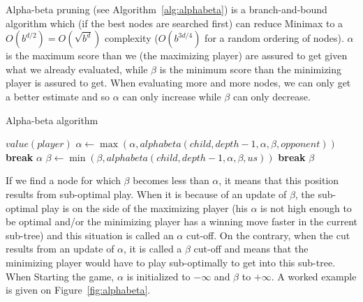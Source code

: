 Alpha-beta pruning (see Algorithm~\ref{alg:alphabeta}) is a branch-and-bound algorithm which (if the best nodes are searched first) can reduce Minimax to a $O(b^{d/2})=O(\sqrt{b^d})$ complexity ($O(b^{3d/4})$ for a random ordering of nodes). $\alpha$ is the maximum score than we (the maximizing player) are assured to get given what we already evaluated, while $\beta$ is the minimum score than the minimizing player is assured to get. When evaluating more and more nodes, we can only get a better estimate and so $\alpha$ can only increase while $\beta$ can only decrease. %
\begin{algorithm}
\caption{Alpha-beta algorithm}
\label{alg:alphabeta}
\begin{algorithmic}
        \State \Return $value(player)$
    \EndIf
            \State $\alpha \gets \max{(\alpha, alphabeta(child,depth-1,\alpha,\beta,opponent))}$
            \If{$\beta \leq \alpha$}
                \State \textbf{break}
            \EndIf
        \EndFor
        \State \Return $\alpha$
    \Else
            \State $\beta \gets \min{(\beta, alphabeta(child,depth-1,\alpha,\beta,us))}$
            \If{$\beta \leq \alpha$}
                \State \textbf{break}
            \EndIf
        \EndFor
        \State \Return $\beta$
    \EndIf
\EndFunction
\end{algorithmic}
\end{algorithm}
If we find a node for which $\beta$ becomes less than $\alpha$, it means that this position results from sub-optimal play. When it is because of an update of $\beta$, the sub-optimal play is on the side of the maximizing player (his $\alpha$ is not high enough to be optimal and/or the minimizing player has a winning move faster in the current sub-tree) and this situation is called an $\alpha$ cut-off. On the contrary, when the cut results from an update of $\alpha$, it is called a $\beta$ cut-off and means that the minimizing player would have to play sub-optimally to get into this sub-tree. When Starting the game, $\alpha$ is initialized to $-\infty$ and $\beta$ to $+\infty$. A worked example is given on Figure~\ref{fig:alphabeta}.

